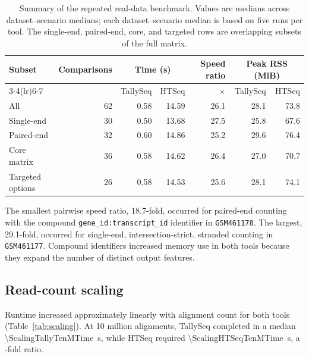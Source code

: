 \documentclass[11pt]{article}
\begin{document}
\begin{table}[ht]
\centering
\caption{Summary of the repeated real-data benchmark. Values are medians across dataset--scenario medians; each dataset--scenario median is based on five runs per tool. The single-end, paired-end, core, and targeted rows are overlapping subsets of the full matrix.}
\label{tab:benchmark}
\begin{tabular}{lrrrrrr}
\toprule
Subset & Comparisons & \multicolumn{2}{c}{Time (s)} & Speed ratio & \multicolumn{2}{c}{Peak RSS (MiB)} \\
\cmidrule(lr){3-4}\cmidrule(lr){6-7}
 & & TallySeq & HTSeq & $\times$ & TallySeq & HTSeq \\
\midrule
All & 62 & 0.58 & 14.59 & 26.1 & 28.1 & 73.8 \\
Single-end & 30 & 0.50 & 13.68 & 27.5 & 25.8 & 67.6 \\
Paired-end & 32 & 0.60 & 14.86 & 25.2 & 29.6 & 76.4 \\
Core matrix & 36 & 0.58 & 14.62 & 26.4 & 27.0 & 70.7 \\
Targeted options & 26 & 0.58 & 14.53 & 25.6 & 28.1 & 74.1 \\
\bottomrule
\end{tabular}
\end{table}

The smallest pairwise speed ratio, 18.7-fold, occurred for paired-end counting with the compound \texttt{gene\_id:transcript\_id} identifier in \texttt{GSM461178}. The largest, 29.1-fold, occurred for single-end, intersection-strict, stranded counting in \texttt{GSM461177}. Compound identifiers increased memory use in both tools because they expand the number of distinct output features.

\subsection{Read-count scaling}

Runtime increased approximately linearly with alignment count for both tools (Table~\ref{tab:scaling}). At 10 million alignments, TallySeq completed in a median \SI{\ScalingTallyTenMTime}{\second}, while HTSeq required \SI{\ScalingHTSeqTenMTime}{\second}, a \ScalingTenMSpeedup{}-fold ratio.
\end{document}
